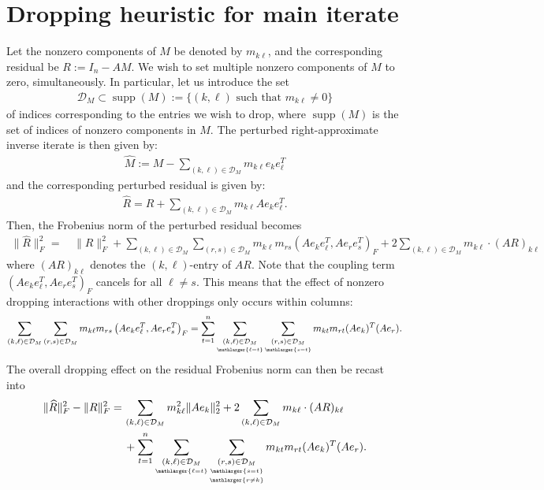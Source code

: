 \documentclass[numbers,webpdf,imanum]{ima-authoring-template}%
\theoremstyle{thmstyletwo}%
\numberwithin{equation}{section}
\begin{document}
\section{Dropping heuristic for main iterate}\label{sec:heuristic}
Let the nonzero components of $M$ be denoted by $m_{k\ell}$, and the corresponding residual be $R:=I_n-AM$.
We wish to set multiple nonzero components of $M$ to zero, simultaneously.
In particular, let us introduce the set
\begin{align}\label{eq:400}
\mathcal{D}_M\subset\operatorname{supp}(M):=\{(k,\ell)\text{ such that }m_{k\ell}\neq 0\}
\end{align}
of indices corresponding to the entries we wish to drop, where $\operatorname{supp}(M)$ is the set of indices of nonzero components in $M$.
The perturbed right-approximate inverse iterate is then given by:
\begin{align}\label{eq:405}
\widehat{M}:=M-\sum_{(k,\ell)\in \mathcal{D}_M}m_{k\ell}e_ke_\ell^T
\end{align}
and the corresponding perturbed residual is given by:
\begin{align}\label{eq:410}
\widehat{R}
=R+
\sum_{(k,\ell)\in \mathcal{D}_M}m_{k\ell}Ae_ke_\ell^T.
\end{align}
Then, the Frobenius norm of the perturbed residual becomes
\begin{align}\label{eq:415}
\|\widehat{R}\|_F^2
=&\,\|R\|_F^2
+\sum_{(k,\ell)\in \mathcal{D}_M}\sum_{(r,s)\in \mathcal{D}_M}
m_{k\ell}m_{rs}
\left(Ae_ke_\ell^T,Ae_re_s^T\right)_F
+2\sum_{(k,\ell)\in \mathcal{D}_M} m_{k\ell}\cdot(AR)_{k\ell}
\end{align}
where $(AR)_{k\ell}$ denotes the $(k,\ell)$-entry of $AR$.
Note that the coupling term $(Ae_ke_\ell^T,Ae_re_s^T)_F$ cancels for all $\ell\neq s$.
This means that the effect of nonzero dropping interactions with other droppings only occurs within columns:
\begin{align}\label{eq:420}
\sum_{(k,\ell)\in \mathcal{D}_M}\sum_{(r,s)\in \mathcal{D}_M}
m_{k\ell}m_{rs}
\left(Ae_ke_\ell^T,Ae_re_s^T\right)_F
=
\sum_{t=1}^n
\sum_{\underset{\mathlarger{\ell=t}}{(k,\ell)\in \mathcal{D}_M}}
\sum_{\underset{\mathlarger{s=t}}{(r,s)\in \mathcal{D}_M}}
m_{kt}m_{rt}(Ae_k)^T(Ae_r).
\end{align}
The overall dropping effect on the residual Frobenius norm can then be recast into
\begin{align}\label{eq:425}
\|\widehat{R}\|_F^2-\|R\|_F^2
=&\,
\sum_{(k,\ell)\in \mathcal{D}_M}
m_{k\ell}^2\|Ae_k\|_2^2
+2\sum_{(k,\ell)\in \mathcal{D}_M} m_{k\ell}\cdot(AR)_{k\ell}\\
&\,+\sum_{t=1}^n
\sum_{\underset{\mathlarger{\ell=t}}{(k,\ell)\in \mathcal{D}_M}}
\sum_{\underset{\mathlarger{r\neq k}}{\underset{\mathlarger{s=t}}{(r,s)\in \mathcal{D}_M}}}
m_{kt}m_{rt}(Ae_k)^T(Ae_r).\nonumber
\end{align}
\end{document}
